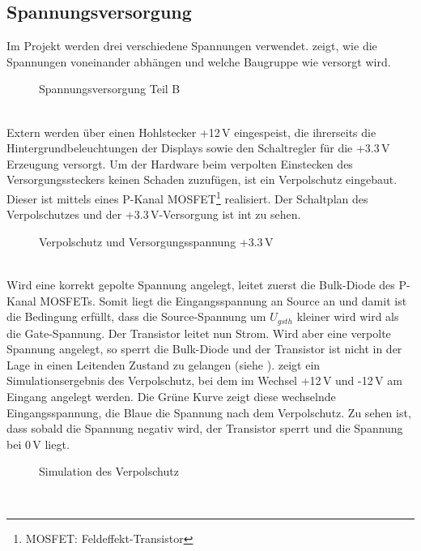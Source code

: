\subsection{Spannungsversorgung}
Im Projekt werden drei verschiedene Spannungen verwendet.  zeigt, wie die Spannungen voneinander abhängen und welche Baugruppe wie versorgt wird. 
\begin{figure}[htp]
	\center
    \caption{Spannungsversorgung Teil B}
    \label{fig:teilb_supply}
\end{figure}\\
Extern werden über einen Hohlstecker +12\,V eingespeist, die ihrerseits die Hintergrundbeleuchtungen der Displays sowie den Schaltregler für die +3.3\,V Erzeugung versorgt. Um der Hardware beim verpolten Einstecken des Versorgungssteckers keinen Schaden zuzufügen, ist ein Verpolschutz eingebaut. Dieser ist mittels eines P-Kanal MOSFET\footnote{MOSFET: Feldeffekt-Transistor}  realisiert. Der Schaltplan des Verpolschutzes und der +3.3\,V-Versorgung ist int  zu sehen.
\begin{figure}[htp]
	\center
    \caption{Verpolschutz und Versorgungsspannung +3.3\,V}
    \label{fig:3_3_supply}
\end{figure}\\
Wird eine korrekt gepolte Spannung angelegt, leitet zuerst die Bulk-Diode des P-Kanal MOSFETs. Somit liegt die Eingangsspannung an Source an und damit ist die Bedingung erfüllt, dass die Source-Spannung um $U_{gsth}$ kleiner wird wird als die Gate-Spannung. Der Transistor leitet nun Strom. Wird aber eine verpolte Spannung angelegt, so sperrt die Bulk-Diode und der Transistor ist nicht in der Lage in einen Leitenden Zustand zu gelangen (siehe \cite{Miller2010}).  zeigt ein Simulationsergebnis des Verpolschutz, bei dem im Wechsel +12\,V und -12\,V am Eingang angelegt werden. Die Grüne Kurve zeigt diese wechselnde Eingangsspannung, die Blaue die Spannung nach dem Verpolschutz. Zu sehen ist, dass sobald die Spannung negativ wird, der Transistor sperrt und die Spannung bei 0\,V liegt.
\begin{figure}[htp]
	\center
    \caption{Simulation des Verpolschutz}
    \label{fig:verpolschutz_sim}
\end{figure}\\

